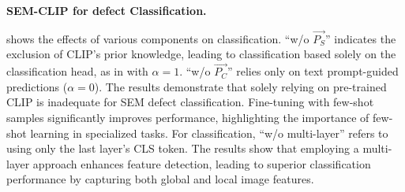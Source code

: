\noindent
\textbf{SEM-CLIP for defect Classification.}

 shows the effects of various components on classification. ``w/o \( \vec{P_S} \)'' indicates the exclusion of CLIP’s prior knowledge, leading to classification based solely on the classification head, as in  with \( \alpha = 1 \). ``w/o \( \vec{P_C} \)'' relies only on text prompt-guided predictions (\( \alpha = 0 \)). The results demonstrate that solely relying on pre-trained CLIP is inadequate for SEM defect classification. Fine-tuning with few-shot samples significantly improves performance, highlighting the importance of few-shot learning in specialized tasks.
For classification, ``w/o multi-layer'' refers to using only the last layer’s CLS token. The results show that employing a multi-layer approach enhances feature detection, leading to superior classification performance by capturing both global and local image features.

